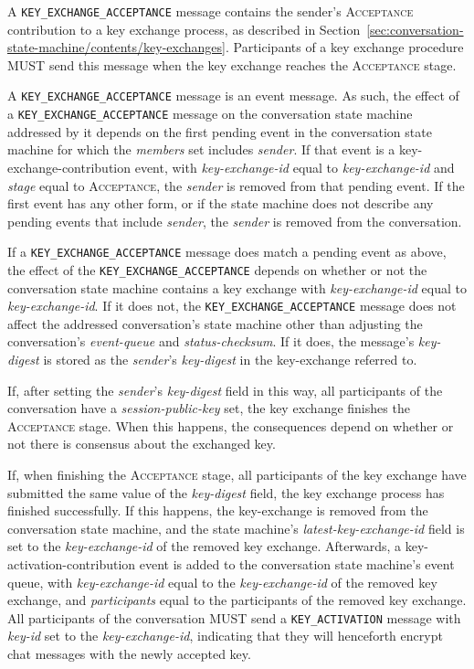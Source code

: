 \documentclass{article}
\def\message#1{\texttt{#1}}
\def\field#1{\textit{#1}}
\def\smfield#1{\textsl{#1}}
\def\type#1{\textsf{#1}}
\begin{document}
A \message{KEY\_EXCHANGE\_ACCEPTANCE} message contains the sender's \textsc{Acceptance} contribution to a key exchange process, as described in Section~\ref{sec:conversation-state-machine/contents/key-exchanges}.
Participants of a key exchange procedure MUST send this message when the key exchange reaches the \textsc{Acceptance} stage.

A \message{KEY\_EXCHANGE\_ACCEPTANCE} message is an event message.
As such, the effect of a \message{KEY\_EXCHANGE\_ACCEPTANCE} message on the conversation state machine addressed by it depends on the first pending event in the conversation state machine for which the \smfield{members} set includes \field{sender}.
If that event is a \type{key-exchange-contribution} event, with \smfield{key-exchange-id} equal to \field{key-exchange-id} and \smfield{stage} equal to \textsc{Acceptance}, the \field{sender} is removed from that pending event.
If the first event has any other form, or if the state machine does not describe any pending events that include \field{sender}, the \field{sender} is removed from the conversation.

If a \message{KEY\_EXCHANGE\_ACCEPTANCE} message does match a pending event as above, the effect of the \message{KEY\_EXCHANGE\_ACCEPTANCE} depends on whether or not the conversation state machine contains a key exchange with \smfield{key-exchange-id} equal to \field{key-exchange-id}.
If it does not, the \message{KEY\_EXCHANGE\_ACCEPTANCE} message does not affect the addressed conversation's state machine other than adjusting the conversation's \smfield{event-queue} and \smfield{status-checksum}.
If it does, the message's \field{key-digest} is stored as the \field{sender}'s \smfield{key-digest} in the \type{key-exchange} referred to.

If, after setting the \field{sender}'s \smfield{key-digest} field in this way, all participants of the conversation have a \smfield{session-public-key} set, the key exchange finishes the \textsc{Acceptance} stage.
When this happens, the consequences depend on whether or not there is consensus about the exchanged key.

If, when finishing the \textsc{Acceptance} stage, all participants of the key exchange have submitted the same value of the \smfield{key-digest} field, the key exchange process has finished successfully.
If this happens, the \type{key-exchange} is removed from the conversation state machine, and the state machine's \smfield{latest-key-exchange-id} field is set to the \smfield{key-exchange-id} of the removed key exchange.
Afterwards, a \type{key-activation-contribution} event is added to the conversation state machine's event queue, with \smfield{key-exchange-id} equal to the \smfield{key-exchange-id} of the removed key exchange, and \smfield{participants} equal to the participants of the removed key exchange.
All participants of the conversation MUST send a \message{KEY\_ACTIVATION} message with \field{key-id} set to the \smfield{key-exchange-id}, indicating that they will henceforth encrypt chat messages with the newly accepted key.
\end{document}

